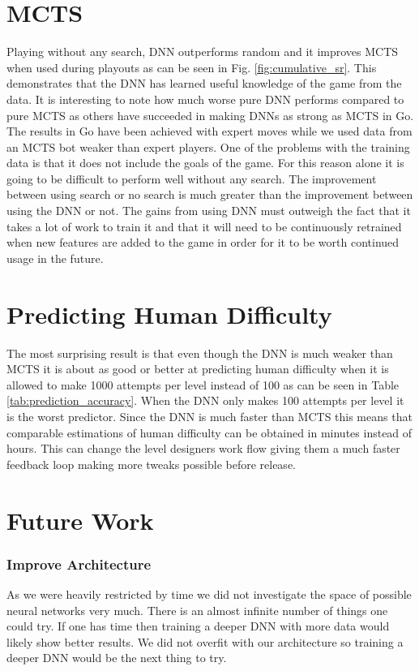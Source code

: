 \documentclass{kththesis}
\begin{document}
\section{MCTS}
Playing without any search, DNN outperforms random and it improves MCTS when used during playouts as can be seen in Fig. \ref{fig:cumulative_sr}. This demonstrates  that the DNN has learned useful knowledge of the game from the data. It is interesting to note how much worse pure DNN performs compared to pure MCTS as others have succeeded in making DNNs as strong as MCTS in Go. The results in Go have been achieved with expert moves while we used data from an MCTS bot weaker than expert players. One of the problems with the training data is that it does not include the goals of the game. For this reason alone it is going to be difficult to perform well without any search. The improvement between using search or no search is much greater than the improvement between using the DNN or not. The gains from using DNN must outweigh the fact that it takes a lot of work to train it and that it will need to be continuously retrained when new features are added to the game in order for it to be worth continued usage in the future.

\section{Predicting Human Difficulty}
The most surprising result is that even though the DNN is much weaker than MCTS it is about as good or better at predicting human difficulty when it is allowed to make 1000 attempts per level instead of 100 as can be seen in Table \ref{tab:prediction_accuracy}. When the DNN only makes 100 attempts per level it is the worst predictor. Since the DNN is much faster than MCTS this means that comparable estimations of human difficulty can be obtained in minutes instead of hours. This can change the level designers work flow  giving them a much faster feedback loop making more tweaks possible before release.

\section{Future Work}
\subsubsection{Improve Architecture}
As we were heavily restricted by time  we did not investigate the space of possible neural networks very much. There is an almost infinite number of things one could try. If one has time then training a deeper DNN with more data would likely show better results. We did not overfit with our architecture so training a deeper DNN would be the next thing to try.
\end{document}
